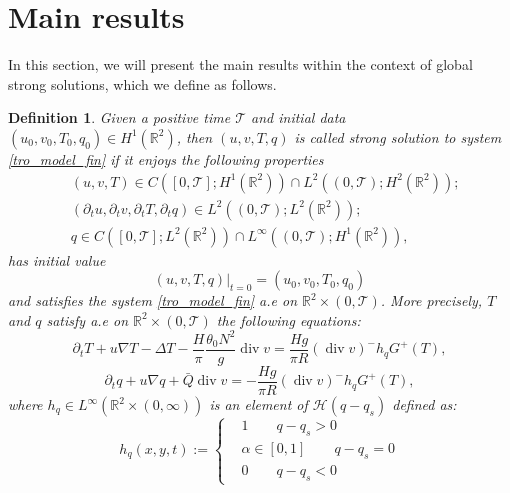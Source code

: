 \documentclass[11pt, a4paper, article,reqno,]{amsart}
\newtheorem{definition}[theorem]{Definition}
\theoremstyle{remark}
\DeclareMathOperator{\dive}{div}
\numberwithin{equation}{section}
\begin{document}
\section{Main results}\label{sec:mainresults}
In this section, we will present the main results within the context of global strong solutions, which we define as follows.

\begin{definition}\label{def_strong}
Given a positive time $\mathcal{T}$ and initial data $(u_0 , v_0 , T_{0}, q_0) \in H^1(\mathbb{R}^2)$, then $(u,v,T,q)$ is called strong solution to system \eqref{tro_model_fin}  if it enjoys the following properties
\begin{equation*}
    \begin{aligned}
        & (u,v,T) \in C([0,\mathcal{T}]; H^1(\mathbb{R}^2)) \cap L^2((0,\mathcal{T}); H^2(\mathbb{R}^2));\\
        &(\partial_t u, \partial_t v, \partial_t T, \partial_t q) \in L^2((0,\mathcal{T}); L^2(\mathbb{R}^2)); \\
        &q \in C([0,\mathcal{T}]; L^2(\mathbb{R}^2)) \cap L^{\infty}((0,\mathcal{T}); H^1(\mathbb{R}^2)),
    \end{aligned}
\end{equation*}
has initial value
\begin{equation*}
    (u,v,T,q)\big|_{t=0} = (u_0 , v_0 , T_0, q_0)
\end{equation*} and satisfies the system \eqref{tro_model_fin} a.e on $\mathbb{R}^2 \times (0, \mathcal{T})$. More precisely, $T$ and $q$ satisfy a.e on $\mathbb{R}^2 \times (0, \mathcal{T})$ the following equations:
\begin{equation}\label{eq_T}
    \partial_t T + u \nabla T - \Delta T -\frac{H}{\pi}\frac{\theta_0 N^2}{g} \dive v =   \frac{H g}{\pi R}(\dive v)^- h_q G^+(T),
\end{equation}
\begin{equation}\label{eq_q}
    \partial_t q + u \nabla q + \bar{Q} \dive v = -  \frac{H g}{\pi R}(\dive v)^- h_q G^+(T),
\end{equation}
where $h_q \in L^{\infty}(\mathbb{R}^2 \times (0, \infty))$ is an element of $\mathcal{H}(q-q_s)$ defined as:
\begin{equation}\label{def_hq}
   h_q(x,y,t) := \left \{ \begin{aligned}
        & 1 \qquad q-q_s > 0 \\
        & \alpha \in [0,1] \qquad q-q_s=0 \\
        & 0 \qquad q-q_s < 0
    \end{aligned} \right.
\end{equation}
\end{definition}
\end{document}
